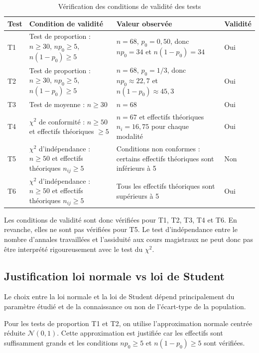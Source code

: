 \begin{table}[H]
\centering
\small
\begin{tabular}{p{1.1cm}p{4.3cm}p{4.6cm}p{1.8cm}}
\toprule
Test & Condition de validité & Valeur observée & Validité \\
\midrule
T1 & Test de proportion : $n \geq 30$, $np_0 \geq 5$, $n(1-p_0) \geq 5$
& $n=68$, $p_0=0{,}50$, donc $np_0=34$ et $n(1-p_0)=34$
& Oui \\
\midrule
T2 & Test de proportion : $n \geq 30$, $np_0 \geq 5$, $n(1-p_0) \geq 5$
& $n=68$, $p_0=1/3$, donc $np_0 \approx 22{,}7$ et $n(1-p_0) \approx 45{,}3$
& Oui \\
\midrule
T3 & Test de moyenne : $n \geq 30$
& $n=68$
& Oui \\
\midrule
T4 & $\chi^2$ de conformité : $n \geq 50$ et effectifs théoriques $\geq 5$
& $n=67$ et effectifs théoriques $n_i=16{,}75$ pour chaque modalité
& Oui \\
\midrule
T5 & $\chi^2$ d'indépendance : $n \geq 50$ et effectifs théoriques $n_{ij} \geq 5$
& Conditions non conformes : certains effectifs théoriques sont inférieurs à 5
& Non \\
\midrule
T6 & $\chi^2$ d'indépendance : $n \geq 50$ et effectifs théoriques $n_{ij} \geq 5$
& Tous les effectifs théoriques sont supérieurs à 5
& Oui \\
\bottomrule
\end{tabular}
\caption{Vérification des conditions de validité des tests}
\end{table}

Les conditions de validité sont donc vérifiées pour T1, T2, T3, T4 et T6. En revanche, elles ne sont pas vérifiées pour T5. Le test d'indépendance entre le nombre d'annales travaillées et l'assiduité aux cours magistraux ne peut donc pas être interprété rigoureusement avec le test du $\chi^2$.

\subsection{Justification loi normale vs loi de Student}

Le choix entre la loi normale et la loi de Student dépend principalement du paramètre étudié et de la connaissance ou non de l'écart-type de la population.

Pour les tests de proportion T1 et T2, on utilise l'approximation normale centrée réduite $\mathcal{N}(0,1)$. Cette approximation est justifiée car les effectifs sont suffisamment grands et les conditions $np_0 \geq 5$ et $n(1-p_0) \geq 5$ sont vérifiées.

